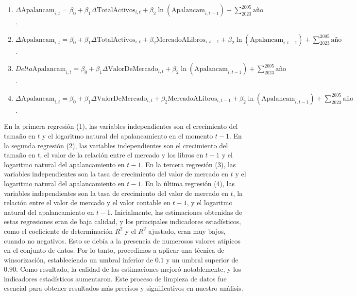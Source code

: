 \documentclass[a4paper,fleqn]{cas-sc}
\begin{document}
\begin{enumerate}[(1)]
    \item $\Delta \text{Apalancam}_{i,t} = \beta_0 + \beta_1 \Delta \text{TotalActivos}_{i,t} + \beta_2 \ln(\text{Apalancam}_{i,t-1}) + \sum\limits_{2023}^{2005} \text{año}$.

    \item $\Delta \text{Apalancam}_{i,t} = \beta_0 + \beta_1 \Delta \text{TotalActivos}_{i,t} + \beta_2 \text{MercadoALibros}_{i,t-1} + \beta_2 \ln(\text{Apalancam}_{i,t-1}) + \sum\limits_{2023}^{2005} \text{año}$.

    \item $Delta \text{Apalancam}_{i,t} = \beta_0 + \beta_1 \Delta \text{ValorDeMercado}_{i,t} + \beta_2 \ln(\text{Apalancam}_{i,t-1}) + \sum\limits_{2023}^{2005} \text{año}$.

    \item $\Delta \text{Apalancam}_{i,t} = \beta_0 + \beta_1 \Delta \text{ValorDeMercado}_{i,t} + \beta_2 \text{MercadoALibros}_{i,t-1} + \beta_2 \ln(\text{Apalancam}_{i,t-1}) + \sum\limits_{2023}^{2005} \text{año}$.

\end{enumerate}

En la primera regresión (1), las variables independientes son el crecimiento del tamaño en $t$ y el logaritmo natural del apalancamiento en el momento $t-1$. En la segunda regresión (2), las variables independientes son el crecimiento del tamaño en $t$, el valor de la relación entre el mercado y los libros en $t-1$ y el logaritmo natural del apalancamiento en $t-1$. En la tercera regresión (3), las variables independientes son la tasa de crecimiento del valor de mercado en $t$ y el logaritmo natural del apalancamiento en $t-1$. En la última regresión (4), las variables independientes son la tasa de crecimiento del valor de mercado en $t$, la relación entre el valor de mercado y el valor contable en $t-1$, y el logaritmo natural del apalancamiento en $t-1$.
Inicialmente, las estimaciones obtenidas de estas regresiones eran de baja calidad, y los principales indicadores estadísticos, como el coeficiente de determinación $R^2$ y el $R^2$ ajustado, eran muy bajos, cuando no negativos. Esto se debía a la presencia de numerosos valores atípicos en el conjunto de datos. Por lo tanto, procedimos a aplicar una técnica de winsorización, estableciendo un umbral inferior de $0.1$ y un umbral superior de $0.90$. Como resultado, la calidad de las estimaciones mejoró notablemente, y los indicadores estadísticos aumentaron. Este proceso de limpieza de datos fue esencial para obtener resultados más precisos y significativos en nuestro análisis.
\end{document}
